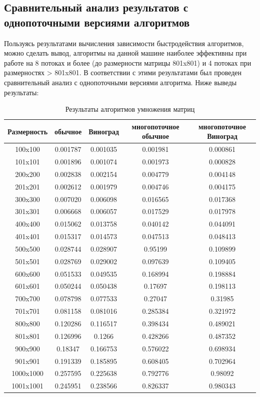 \documentclass[a4paper,12pt]{article}
\begin{document}
\newpage
\subsection{Сравнительный анализ результатов с однопоточными версиями алгоритмов}
Пользуясь результатами вычисления зависимости быстродействия алгоритмов, можно сделать вывод, алгоритмы на данной машине наиболее эффективны при работе на 8 потоках и более (до размерности матрицы 801x801) и 4 потоках при размерностях > 801x801.
В соответствии с этими результатами был проведен сравнительный анализ с однопоточными версиями алгоритма. Ниже выведы результаты:\\
\begin{table}[h]
\caption{\label{tablice:tests}Результаты алгоритмов умножения матриц}
\begin{flushleft}
\begin{tabular}{|c|c|c|c|c|}
\hline
Размерность & обычное & Виноград & многопоточное обычное & многопоточное Виноград\\
\hline
100x100 & 0.001787 & 0.001035 & 0.001981 & 0.000861\\
\hline
101x101 & 0.001896 & 0.001074 & 0.001973 & 0.000828\\
\hline
200x200 & 0.002838 & 0.002154 & 0.004779 & 0.004148\\
\hline
201x201 & 0.002612 & 0.001979 & 0.004746 & 0.004175\\
\hline
300x300 & 0.007020 & 0.006098 & 0.016565 & 0.017368\\
\hline
301x301 & 0.006668 & 0.006057 & 0.017529 & 0.017978\\
\hline
400x400 & 0.015062 & 0.013758 & 0.040142 & 0.044091\\
\hline
401x401 & 0.015317 & 0.014573 & 0.047513 & 0.048413\\
\hline
500x500 & 0.028744 & 0.028907 & 0.95199 & 0.109899\\
\hline
501x501 & 0.028769 & 0.029002 & 0.097639 & 0.109405\\
\hline
600x600 & 0.051533 & 0.049535 & 0.168994 & 0.198884\\
\hline
601x601 & 0.050244 & 0.050438 & 0.17697 & 0.198113\\
\hline
700x700 & 0.078798 & 0.077533 & 0.27047 & 0.31985\\
\hline
701x701 & 0.081158 & 0.081016 & 0.285384 & 0.321972\\
\hline
800x800 & 0.120286 & 0.116517 & 0.398434 & 0.489021\\
\hline
801x801 & 0.126996 & 0.1266 & 0.428266 & 0.487352\\
\hline
900x900 & 0.18347 & 0.166753 & 0.576022 & 0.698934\\
\hline
901x901 & 0.191339 & 0.185895 & 0.608405 & 0.702964\\
\hline
1000x1000 & 0.257595 & 0.225638 & 0.792776 & 0.98092\\
\hline
1001x1001 & 0.245951 & 0.238566 & 0.826337 & 0.980343\\
\hline
\end{tabular}
\end{flushleft}
\end{table}
\end{document}
